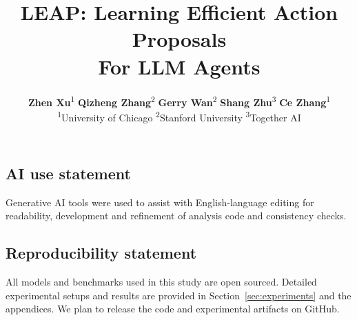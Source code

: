 \documentclass{article} %
\title{LEAP: Learning Efficient Action Proposals \\ For LLM Agents}
\author{
\parbox{\textwidth}{\centering
\textbf{Zhen Xu}\textsuperscript{1}\qquad
\textbf{Qizheng Zhang}\textsuperscript{2}\qquad
\textbf{Gerry Wan}\textsuperscript{2}\qquad
\textbf{Shang Zhu}\textsuperscript{3}\qquad
\textbf{Ce Zhang}\textsuperscript{1}
\\[0.6em]
{\normalfont\small
\textsuperscript{1}University of Chicago
\qquad
\textsuperscript{2}Stanford University
\qquad
\textsuperscript{3}Together AI
}
}
}
\begin{document}
\maketitle
{}


\clearpage

\subsection*{AI use statement}

Generative AI tools were used to assist with English-language editing for readability, development and refinement of analysis code and consistency checks.

\subsection*{Reproducibility statement}

All models and benchmarks used in this study are open sourced. Detailed experimental setups and results are provided in Section~\ref{sec:experiments} and the appendices. We plan to release the code and experimental artifacts on GitHub.




\clearpage
\appendix


\end{document}

